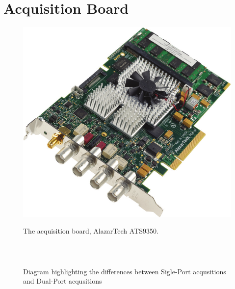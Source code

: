 \section{Acquisition Board}

    \begin{figure}[bth]
    \myfloatalign
    {\includegraphics[width=.6\linewidth]{gfx/board}}
    \caption{The acquisition board, AlazarTech ATS9350.}\label{fig:acq-board}
    \end{figure}
	\subsection{}

    \begin{figure}[bth]
    \myfloatalign
     \\
    \caption{Diagram highlighting the differences between Sigle-Port acqusitions and Dual-Port acqusitions}\label{fig:single-vs-dual-port}
    \end{figure}

